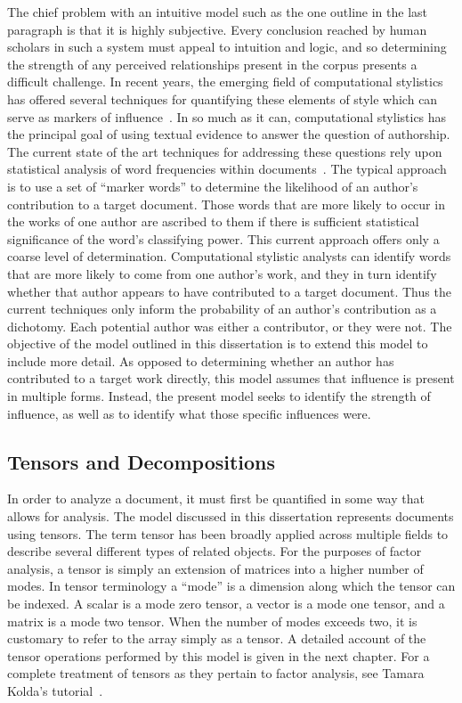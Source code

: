 \documentclass[../dissertation.tex]{subfiles}
\begin{document}
The chief problem with an intuitive model such as the one outline in
the last paragraph is that it is highly subjective.  Every
conclusion reached by human scholars in such a system must appeal to
intuition and logic, and so determining the strength of any perceived
relationships present in the corpus presents a difficult challenge.
In recent years, the emerging field of computational stylistics has
offered several techniques for quantifying these elements of style
which can serve as markers of influence~\cite{bader2007, craig2009,
  burrows2017}.  In so much as it can, computational stylistics has
the principal goal of using textual evidence to answer the question of
authorship.  The current state of the art techniques for addressing
these questions rely upon statistical analysis of word frequencies
within documents~\cite{craig2009}.  The typical
approach is to use a set of ``marker words'' to determine the
likelihood of an author's contribution to a target document.  Those
words that are more likely to occur in the works of one author are
ascribed to them if there is sufficient statistical significance of
the word's classifying power.  This current approach offers only a
coarse level of determination.  Computational stylistic analysts can
identify words that are more likely to come from one author's work,
and they in turn identify whether that author appears to have
contributed to a target document.  Thus the current techniques only
inform the probability of an author's contribution as a dichotomy.
Each potential author was either a contributor, or they were not.  The
objective of the model outlined in this dissertation is to extend this
model to include more detail.  As opposed to determining whether an
author has contributed to a target work directly, this model assumes
that influence is present in multiple forms.  Instead, the present
model seeks to identify the strength of influence, as well as to
identify what those specific influences were.

\subsection{Tensors and Decompositions}
In order to analyze a document, it must first be quantified in some
way that allows for analysis.  The model discussed in this
dissertation represents documents using tensors.  The term tensor has
been broadly applied across multiple fields to describe several
different types of related objects.  For the purposes of factor
analysis, a tensor is simply an extension of matrices into a higher
number of modes. In tensor terminology a ``mode'' is a dimension along
which the tensor can be indexed.  A scalar is a mode zero tensor, a
vector is a mode one tensor, and a matrix is a mode two tensor.  When
the number of modes exceeds two, it is customary to refer to the array
simply as a tensor.  A detailed account of the tensor operations
performed by this model is given in the next chapter.  For a complete
treatment of tensors as they pertain to factor analysis, see Tamara
Kolda's tutorial~\cite{kolda2009}.
\end{document}
